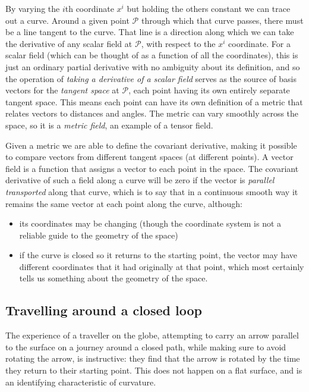 By varying the $i$th coordinate $x^i$ but holding the others constant we can trace out a curve. Around a given point $\mathcal{P}$ through which that curve passes, there must be a line tangent to the curve. That line is a direction along which we can take the derivative of any scalar field at $\mathcal{P}$, with respect to the $x^i$ coordinate. For a scalar field (which can be thought of as a function of all the coordinates), this is just an ordinary partial derivative with no ambiguity about its definition, and so the operation of \textit{taking a derivative of a scalar field} serves as the source of basis vectors for the \textit{tangent space} at $\mathcal{P}$, each point having its own entirely separate tangent space. This means each point can have its own definition of a metric that relates vectors to distances and angles. The metric can vary smoothly across the space, so it is a \textit{metric field}, an example of a tensor field.

Given a metric we are able to define the covariant derivative, making it possible to compare vectors from different tangent spaces (at different points). A vector field is a function that assigns a vector to each point in the space. The covariant derivative of such a field along a curve will be zero if the vector is \textit{parallel transported} along that curve, which is to say that in a continuous smooth way it remains the same vector at each point along the curve, although:

\begin{itemize}
    \item its coordinates may be changing (though the coordinate system is not a reliable guide to the geometry of the space)
    \item if the curve is closed so it returns to the starting point, the vector may have different coordinates that it had originally at that point, which most certainly tells us something about the geometry of the space.
\end{itemize}



\subsection{Travelling around a closed loop}

The experience of a traveller on the globe, attempting to carry an arrow parallel to the surface on a journey around a closed path, while making sure to avoid rotating the arrow, is instructive: they find that the arrow is rotated by the time they return to their starting point. This does not happen on a flat surface, and is an identifying characteristic of curvature.

